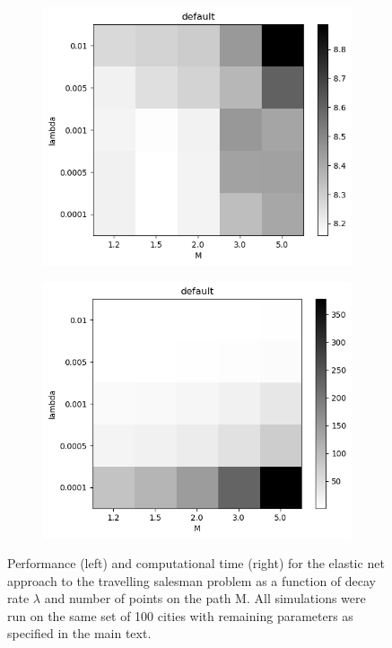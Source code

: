 \documentclass{article}
\begin{document}
\begin{figure}[h]
	\centering
	\begin{subfigure}[t]{0.35\linewidth}
		\centering
		\includegraphics[width = 1.0\linewidth, trim={8 10 7 20}, clip=true]{figures/Ls.png}
		\label{fig:Ls}	
	\end{subfigure}%
	\hspace{0.1\linewidth}
	\begin{subfigure}[t]{0.35\linewidth}
		\centering
		\includegraphics[width = 1.0\linewidth, trim={8 10 7 20}, clip=true]{figures/Ts.png}
		\label{fig:Ts}	
	\end{subfigure}%
\caption{Performance (left) and computational time (right) for the elastic net approach to the travelling salesman problem as a function of decay rate $\lambda$ and number of points on the path M. All simulations were run on the same set of 100 cities with remaining parameters as specified in the main text.}
\label{fig:tspopt}
\end{figure}
\end{document}
